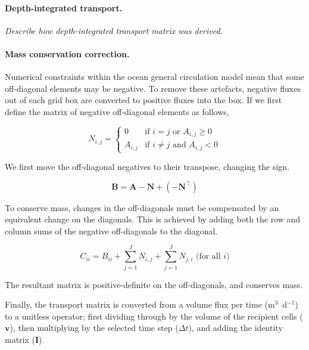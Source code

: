 \documentclass[12pt]{article}
\begin{document}
\paragraph{Depth-integrated transport.}

\textit{Describe how depth-integrated transport matrix was derived.}

\paragraph{Mass conservation correction.}

Numerical constraints within the ocean general circulation model mean that some off-diagonal elements may be negative. To remove these artefacts, negative fluxes out of each grid box are converted to positive fluxes into the box. If we first define the matrix of negative off-diagonal elements as follows,

\begin{equation}
N_{i,j} = 
\begin{cases}
0 		& \text{if $i=j$ or $A_{i,j}\ge 0$}\\
A_{i,j} 	& \text{if $i\ne j$ and $A_{i,j}<0 $}
\end{cases}
\end{equation}

We first move the off-diagonal negatives to their transpose, changing the sign.

\begin{equation}
\mathbf{B} = \mathbf{A} - \mathbf{N} + ( - \mathbf{N}^\top)
\end{equation}

To conserve mass, changes in the off-diagonals must be compensated by an equivalent change on the diagonals. This is achieved by adding both the row and column sums of the negative off-diagonals to the diagonal. 

\begin{equation}
C_{i i} = B_{i i} + \sum_{j=1}^J N_{i,j} + \sum_{j=1}^J N_{j,i} \text{ (for all $i$)}
\end{equation}

The resultant matrix is positive-definite on the off-diagonals, and conserves mass.

Finally, the transport matrix is converted from a volume flux per time (m$^3$~d$^{-1}$) to a unitless operator; first dividing through by the volume of the recipient cells ($\mathbf{v}$), then multiplying by the selected time step ($\Delta t$), and adding the identity matrix ($\mathbf{I}$).
\end{document}
